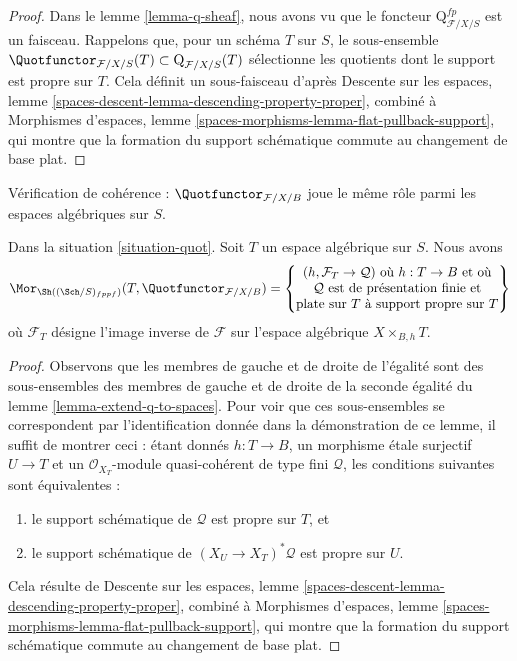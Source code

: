 \begin{proof}
Dans le lemme \ref{lemma-q-sheaf}, nous avons vu que le foncteur
$\text{Q}^{fp}_{\mathcal{F}/X/S}$ est un faisceau. Rappelons que, pour un
schéma $T$ sur $S$, le sous-ensemble
$\Quotfunctor_{\mathcal{F}/X/S}(T) \subset \text{Q}_{\mathcal{F}/X/S}(T)$
sélectionne les quotients dont le support est propre sur $T$. Cela définit un
sous-faisceau d'après Descente sur les espaces, lemme
\ref{spaces-descent-lemma-descending-property-proper}, combiné à Morphismes
d'espaces, lemme \ref{spaces-morphisms-lemma-flat-pullback-support}, qui montre
que la formation du support schématique commute au changement de base plat.
\end{proof}

\noindent
Vérification de cohérence : $\Quotfunctor_{\mathcal{F}/X/B}$ joue le même rôle
parmi les espaces algébriques sur $S$.

\begin{lemma}
\label{lemma-extend-quot-to-spaces}
Dans la situation \ref{situation-quot}. Soit $T$ un espace algébrique sur $S$.
Nous avons
$$
\Mor_{\Sh((\Sch/S)_{fppf})}(T,  \Quotfunctor_{\mathcal{F}/X/B}) =
\left\{
\begin{matrix}
(h, \mathcal{F}_T \to \mathcal{Q}) \text{ où }
h : T \to B \text{ et où}\\
\mathcal{Q}\text{ est de présentation finie et}\\
\text{plate sur }T\text{ à support propre sur }T
\end{matrix}
\right\}
$$
où $\mathcal{F}_T$ désigne l'image inverse de $\mathcal{F}$ sur l'espace
algébrique $X \times_{B, h} T$.
\end{lemma}

\begin{proof}
Observons que les membres de gauche et de droite de l'égalité sont des
sous-ensembles des membres de gauche et de droite de la seconde égalité du
lemme \ref{lemma-extend-q-to-spaces}. Pour voir que ces sous-ensembles se
correspondent par l'identification donnée dans la démonstration de ce lemme, il
suffit de montrer ceci : étant donnés $h : T \to B$, un morphisme étale
surjectif $U \to T$ et un $\mathcal{O}_{X_T}$-module quasi-cohérent de type
fini $\mathcal{Q}$, les conditions suivantes sont équivalentes :
\begin{enumerate}
\item le support schématique de $\mathcal{Q}$ est propre sur $T$, et
\item le support schématique de $(X_U \to X_T)^*\mathcal{Q}$ est propre sur
$U$.
\end{enumerate}
Cela résulte de Descente sur les espaces, lemme
\ref{spaces-descent-lemma-descending-property-proper}, combiné à Morphismes
d'espaces, lemme \ref{spaces-morphisms-lemma-flat-pullback-support}, qui montre
que la formation du support schématique commute au changement de base plat.
\end{proof}

